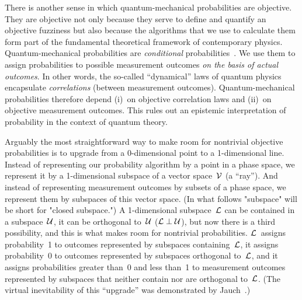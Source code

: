 \documentclass[12pt]{article}
\newcommand{\cL}{{\cal L}}
\newcommand{\cU}{{\cal U}}
\newcommand{\cV}{{\cal V}}
\begin{document}
There is another sense in which quantum-mechanical probabilities are objective. They are objective not only because they serve to define and quantify an objective fuzziness but also because the algorithms that we use to calculate them form part of the fundamental theoretical framework of contemporary physics. Quantum-mechanical probabilities are \textit{conditional} probabilities~\cite{Primas}. We use them to assign probabilities to possible measurement outcomes \textit{on the basis of actual outcomes}. In other words, the so-called ``dynamical'' laws of quantum physics encapsulate \textit{correlations} (between measurement outcomes). Quantum-mechanical probabilities therefore depend (i)~on objective correlation laws and (ii)~on objective measurement outcomes. This rules out an epistemic interpretation of probability in the context of quantum theory.

Arguably the most straightforward way to make room for nontrivial objective probabilities is to upgrade from a 0-dimensional point to a 1-dimensional line. Instead of representing our probability algorithm by a point in a phase space, we represent it by a 1-dimensional subspace of a vector space~$\cV$ (a ``ray''). And instead of representing measurement outcomes by subsets of a phase space, we represent them by subspaces of this vector space. (In what follows "subspace" will be short for "closed subspace.") A 1-dimensional subspace~$\cL$ can be contained in a subspace~$\cU$, it can be orthogonal to~$\cU$ ($\cL\perp\cU$), but now there is a third possibility, and this is what makes room for nontrivial probabilities. $\cL$~assigns probability~1 to outcomes represented by subspaces containing~$\cL$, it assigns probability~0 to outcomes represented by subspaces orthogonal to~$\cL$, and it assigns probabilities greater than~0 and less than~1 to measurement outcomes represented by subspaces that neither contain nor are orthogonal to~$\cL$. (The virtual inevitability of this ``upgrade'' was demonstrated by Jauch~\cite{Jauch}.)

\end{document}
